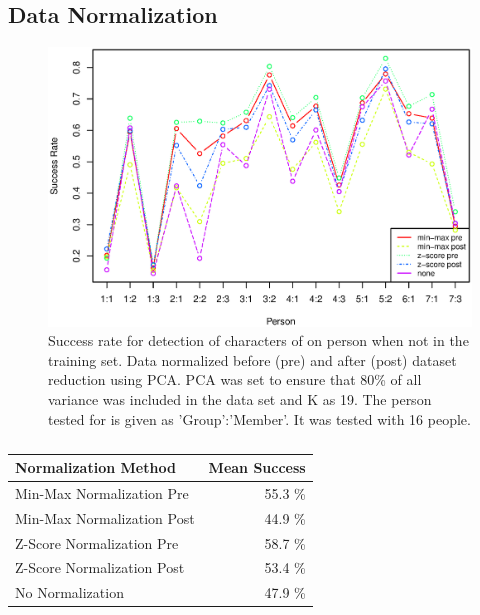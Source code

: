 \subsection{Data Normalization}


\begin{figure}[H]
\centering
\includegraphics[width = 16cm]{graphics/graph_normalization_allppl}
\caption{Success rate for detection of characters of on person when not in the training set. 
Data normalized before (pre) and after (post) dataset reduction using PCA.
PCA was set to ensure that 80\% of all variance was included in the data set and K as 19.
The person tested for is given as 'Group':'Member'.
It was tested with 16 people.}
\label{fig:normalization_test_pre-post}
\end{figure}

\begin{table}[H]
\centering
\begin{tabular}{|l|r|}\hline
Normalization Method & Mean Success \\ \hline
Min-Max Normalization Pre & 55.3 \% \\ \hline
Min-Max Normalization Post & 44.9 \% \\ \hline
Z-Score Normalization Pre & 58.7 \% \\ \hline
Z-Score Normalization Post & 53.4  \% \\ \hline
No Normalization & 47.9 \% \\ \hline
\end{tabular}
\caption{}
\label{tab:meanSuccess_normalization_test_pre-post}
\end{table}

